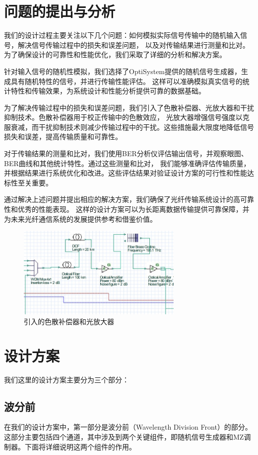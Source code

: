\documentclass[12pt]{article}
\begin{document}
\section{问题的提出与分析}
我们的设计过程主要关注以下几个问题：如何模拟实际信号传输中的随机输入信号，解决信号传输过程中的损失和误差问题，
以及对传输结果进行测量和比对。为了确保设计的可靠性和性能优化，我们采取了详细的分析和解决方案。

针对输入信号的随机性模拟，我们选择了OptiSystem提供的随机信号生成器，生成具有随机特性的信号，并进行传输性能评估。
这样可以准确模拟真实信号的统计特性和传输效果，为系统设计和性能分析提供可靠的数据基础。

为了解决传输过程中的损失和误差问题，我们引入了色散补偿器、光放大器和干扰抑制技术。色散补偿器用于校正传输中的色散效应，
光放大器增强信号强度以克服衰减，而干扰抑制技术则减少传输过程中的干扰。这些措施最大限度地降低信号损失和误差，提高传输质量和可靠性。

对于传输结果的测量和比对，我们使用BER分析仪评估输出信号，并观察眼图、BER曲线和其他统计特性。通过这些测量和比对，
我们能够准确评估传输质量，并根据结果进行系统优化和改进。这些评估结果对验证设计方案的可行性和性能达标性至关重要。

通过解决上述问题并提出相应的解决方案，我们确保了光纤传输系统设计的高可靠性和优秀的性能表现。
这样的设计方案可以为长距离数据传输提供可靠保障，并为未来光纤通信系统的发展提供参考和借鉴价值。




\begin{figure}[htbp]
	\centering
	\includegraphics[width=8cm]{figure2.png}
	\caption{引入的色散补偿器和光放大器}
\end{figure}
\clearpage
\section{设计方案}
我们这里的设计方案主要分为三个部分：
\subsection{波分前}
在我们的设计方案中，第一部分是波分前（Wavelength Division Front）的部分。
这部分主要包括四个通道，其中涉及到两个关键组件，即随机信号生成器和MZ调制器。下面将详细说明这两个组件的作用。
\end{document}
